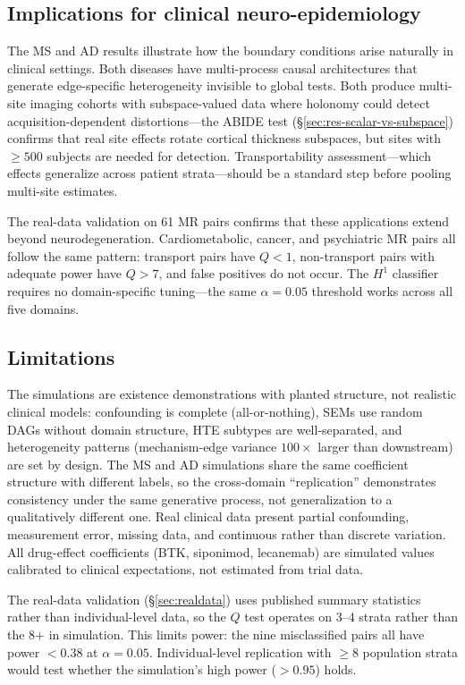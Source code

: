 \documentclass{article}
\begin{document}
\subsection{Implications for clinical neuro-epidemiology}

The MS and AD results illustrate how the boundary conditions arise naturally in clinical settings.
Both diseases have multi-process causal architectures that generate edge-specific heterogeneity invisible to global tests.
Both produce multi-site imaging cohorts with subspace-valued data where holonomy could detect acquisition-dependent distortions---the ABIDE test (\S\ref{sec:res-scalar-vs-subspace}) confirms that real site effects rotate cortical thickness subspaces, but sites with $\geq 500$ subjects are needed for detection.
Transportability assessment---which effects generalize across patient strata---should be a standard step before pooling multi-site estimates.

The real-data validation on 61 MR pairs confirms that these applications extend beyond neurodegeneration.
Cardiometabolic, cancer, and psychiatric MR pairs all follow the same pattern: transport pairs have $Q < 1$, non-transport pairs with adequate power have $Q > 7$, and false positives do not occur. The $H^1$ classifier requires no domain-specific tuning---the same $\alpha = 0.05$ threshold works across all five domains.

\subsection{Limitations}

The simulations are existence demonstrations with planted structure, not realistic clinical models: confounding is complete (all-or-nothing), SEMs use random DAGs without domain structure, HTE subtypes are well-separated, and heterogeneity patterns (mechanism-edge variance $100\times$ larger than downstream) are set by design.
The MS and AD simulations share the same coefficient structure with different labels, so the cross-domain ``replication'' demonstrates consistency under the same generative process, not generalization to a qualitatively different one.
Real clinical data present partial confounding, measurement error, missing data, and continuous rather than discrete variation.
All drug-effect coefficients (BTK, siponimod, lecanemab) are simulated values calibrated to clinical expectations, not estimated from trial data.

The real-data validation (\S\ref{sec:realdata}) uses published summary statistics rather than individual-level data, so the $Q$ test operates on 3--4 strata rather than the 8+ in simulation.
This limits power: the nine misclassified pairs all have power $< 0.38$ at $\alpha = 0.05$.
Individual-level replication with $\geq 8$ population strata would test whether the simulation's high power ($> 0.95$) holds.
\end{document}
